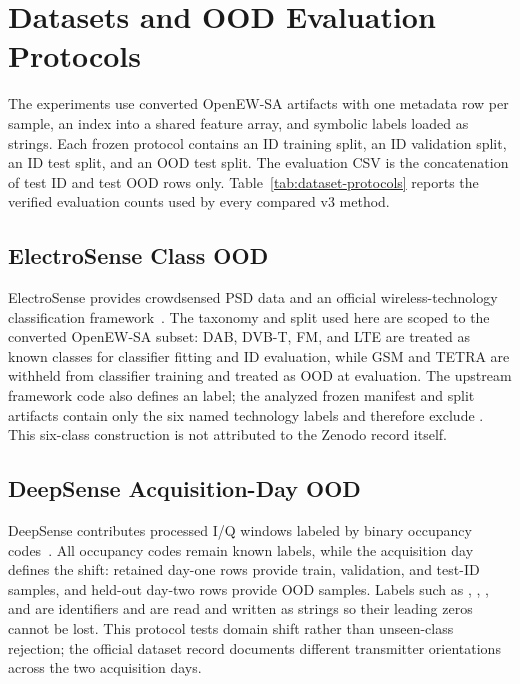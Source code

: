 \section{Datasets and OOD Evaluation Protocols}
\label{sec:datasets}

The experiments use converted OpenEW-SA artifacts with one metadata row per sample, an index into a shared feature array, and symbolic labels loaded as strings. Each frozen protocol contains an ID training split, an ID validation split, an ID test split, and an OOD test split. The evaluation CSV is the concatenation of test ID and test OOD rows only. Table~\ref{tab:dataset-protocols} reports the verified evaluation counts used by every compared v3 method.



\subsection{ElectroSense Class OOD}

ElectroSense provides crowdsensed PSD data and an official wireless-technology classification framework~\cite{rajendran2018electrosense,scalingi2023framework,scalingi2023electrosensepsd}. The taxonomy and split used here are scoped to the converted OpenEW-SA subset: DAB, DVB-T, FM, and LTE are treated as known classes for classifier fitting and ID evaluation, while GSM and TETRA are withheld from classifier training and treated as OOD at evaluation. The upstream framework code also defines an  label; the analyzed frozen manifest and split artifacts contain only the six named technology labels and therefore exclude . This six-class construction is not attributed to the Zenodo record itself.

\subsection{DeepSense Acquisition-Day OOD}

DeepSense contributes processed I/Q windows labeled by binary occupancy codes~\cite{uvaydov2021deepsense,wineslab2021deepsensedataset}. All occupancy codes remain known labels, while the acquisition day defines the shift: retained day-one rows provide train, validation, and test-ID samples, and held-out day-two rows provide OOD samples. Labels such as , , , and  are identifiers and are read and written as strings so their leading zeros cannot be lost. This protocol tests domain shift rather than unseen-class rejection; the official dataset record documents different transmitter orientations across the two acquisition days.

